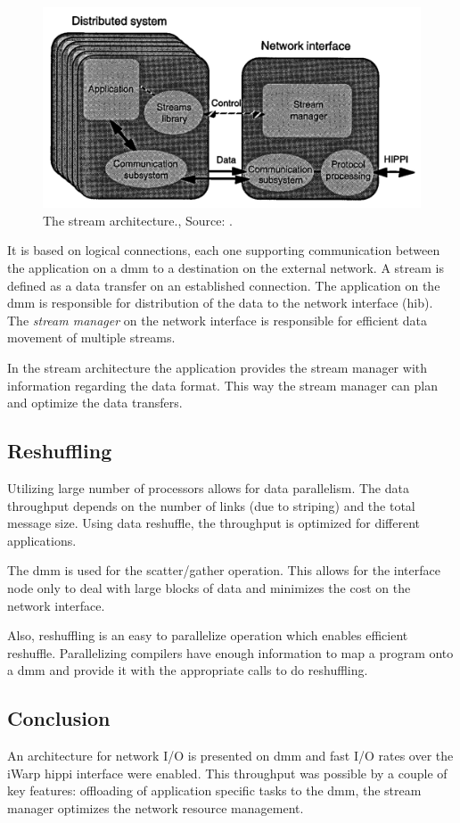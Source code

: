 \begin{figure}
    \centering
	\includegraphics[width=0.95\linewidth]{Figures/Rep4streamsarchitecture.png}
	\caption{The stream architecture., Source: \cite{steenkiste1997high}.}
    \label{fig:rep4:streams}
\end{figure}

It is based on logical connections, each one supporting communication between the application on a \ac{dmm} to a destination on the external network.
A stream is defined as a data transfer on an established connection.
The application on the \ac{dmm} is responsible for distribution of the data to the network interface (\ac{hib}).
The \textit{stream manager} on the network interface is responsible for efficient data movement of multiple streams.

In the stream architecture the application provides the stream manager with information regarding the data format. 
This way the stream manager can plan and optimize the data transfers.


\subsection{Reshuffling}
Utilizing large number of processors allows for data parallelism.
The data throughput depends on the number of links (due to striping) and the total message size.
Using data reshuffle, the throughput is optimized for different applications.

The \ac{dmm} is used for the scatter/gather operation.
This allows for the interface  node only to deal with large blocks of data and minimizes the cost on the network interface.

Also, reshuffling is an easy to parallelize operation which enables efficient reshuffle.
Parallelizing compilers have enough information to map a program onto a \ac{dmm} and provide it with the appropriate calls to do reshuffling.

\subsection{Conclusion}
An architecture for network I/O is presented on \acs{dmm} and fast I/O rates over the iWarp \ac{hippi} interface were enabled.
This throughput was possible by a couple of key features: offloading of application specific tasks to the \ac{dmm}, the stream manager optimizes the network resource management.


